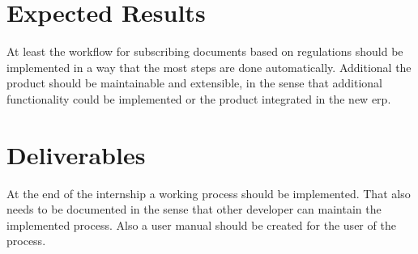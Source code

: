 \section{Expected Results}
At least the workflow for subscribing documents based on regulations should be implemented in a way that the most steps are done automatically. Additional the product should be maintainable and extensible, in the sense that additional functionality could be implemented or the product integrated in the new \gls{erp}.

\section{Deliverables} 
At the end of the internship a working process should be implemented. That also needs to be documented in the sense that other developer can maintain the implemented process. Also a user manual should be created for the user of the process. 